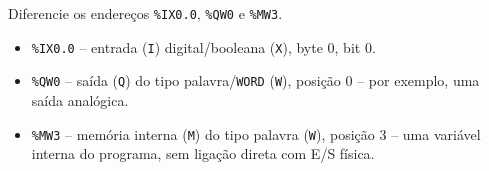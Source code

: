 \question[3] Diferencie os endereços \texttt{\%IX0.0}, \texttt{\%QW0} e \texttt{\%MW3}.

\begin{solution}
\begin{itemize}
  \item \texttt{\%IX0.0} -- entrada (\texttt{I}) digital/booleana (\texttt{X}), byte 0, bit 0.
  \item \texttt{\%QW0} -- saída (\texttt{Q}) do tipo palavra/\texttt{WORD} (\texttt{W}), posição 0 -- por exemplo, uma saída analógica.
  \item \texttt{\%MW3} -- memória interna (\texttt{M}) do tipo palavra (\texttt{W}), posição 3 -- uma variável interna do programa, sem ligação direta com E/S física.
\end{itemize}
\end{solution}

